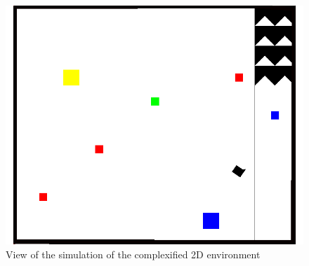 \documentclass[conference]{IEEEtran}
\begin{document}
\begin{figure}
  \includegraphics[scale = 0.3]{images/2Dcomplex.png}
  \caption{View of the simulation of the complexified 2D environment}
  \label{fig:my-figure}
\end{figure}
\end{document}
